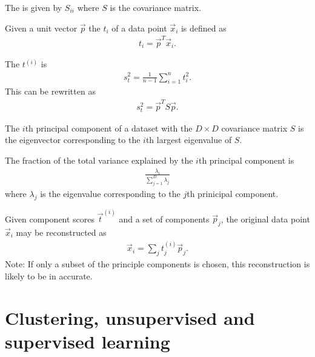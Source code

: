 \documentclass{article}
\begin{document}
\begin{definition}
	The  is given by $S_{ii}$ where $S$ is the
	covariance matrix.
\end{definition}
\begin{definition}
	Given a unit vector $\vec p$ the  $t_i$ of a data point
	$\vec x_i$ is defined as
	\begin{align*}
		t_i = {\vec p}^{T} \vec x_i.
	\end{align*}
\end{definition}
\begin{definition}
	The  $t^{(i)}$ is
	\begin{align*}
		s_t^2 = \frac{1}{n-1}\sum_{i=1}^n t_i^2.
	\end{align*}
	This can be rewritten as
	\begin{align*}
		s^2_t = \vec p^T S\vec p.
	\end{align*}
\end{definition}
\begin{theorem}
	The $i$th principal component of a dataset with the $D\times D$ covariance
	matrix $S$ is the eigenvector corresponding to the $i$th largest eigenvalue 
	of $S$.
\end{theorem}
\begin{proposition}
	The fraction of the total variance explained by the $i$th principal component
	is 
	\begin{align*}
		\frac{\lambda_i}{\sum_{j=1}^D \lambda_j}
	\end{align*}
	where $\lambda_j$ is the eigenvalue corresponding to the $j$th prinicipal
	component.
\end{proposition}

\begin{theorem}
	Given component scores $\vec t^{(i)}$ and a set of components $\vec p_j$,
	the original data point $\vec x_i$ may be reconstructed as
	\begin{align*}
		\vec x_i = \sum_j t^{(i)}_j \vec p_j.
	\end{align*}
	Note: If only a subset of the principle components is chosen, this
	reconstruction is likely to be in accurate.
\end{theorem}


\section{Clustering, unsupervised and supervised learning}
\end{document}
